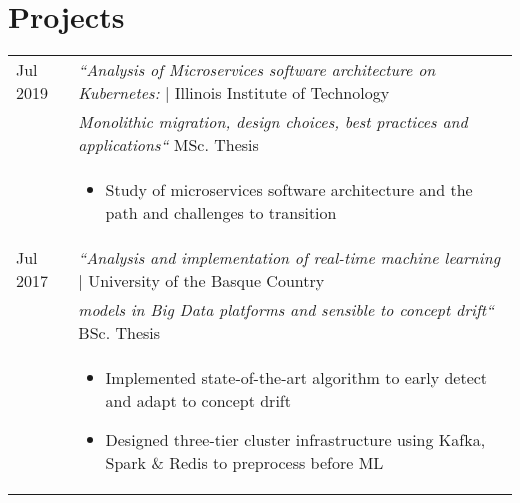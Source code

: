 \documentclass[a4paper,10pt]{article}
\begin{document}
\section{Projects}
\begin{tabular}{p{1.5cm}p{14.8cm}}

  Jul 2019 & \emph{``Analysis of Microservices software architecture on Kubernetes: } \hfill \footnotesize{| Illinois Institute of Technology} \\
  & \hspace{0.1mm} \emph{Monolithic migration, design choices, best practices and applications``} \hfill \footnotesize{MSc. Thesis} \\
  & \footnotesize{ \begin{itemize}[noitemsep,topsep=3pt]
  \vspace{-0.1in}
  \item Study of microservices software architecture and the path and challenges to transition 
  \end{itemize}} \vspace{-0.1in} \\ 

  Jul 2017 & \emph{``Analysis and implementation of real-time machine learning } \hfill \footnotesize{| University of the Basque Country} \\
  & \hspace{0.1mm} \emph{models in Big Data platforms and sensible to concept drift``} \hfill \footnotesize{BSc. Thesis} \\
  & \footnotesize{ \begin{itemize}[noitemsep,topsep=3pt]
  \vspace{-0.1in}
  \item Implemented state-of-the-art algorithm to early detect and adapt to concept drift
  \item Designed three-tier cluster infrastructure using Kafka, Spark \& Redis to preprocess before ML
  \end{itemize}} \vspace{-0.1in} \\ 


\end{tabular}
\end{document}
